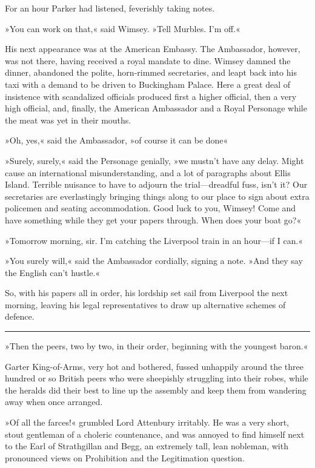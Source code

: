 For an hour Parker had listened, feverishly taking notes.

»You can work on that,« said Wimsey. »Tell Murbles. I'm off.«

His next appearance was at the American Embassy. The Ambassador, however, was not there, having received a royal mandate to dine. Wimsey damned the dinner, abandoned the polite, horn-rimmed secretaries, and leapt back into his taxi with a demand to be driven to Buckingham Palace. Here a great deal of insistence with scandalized officials produced first a higher official, then a very high official, and, finally, the American Ambassador and a Royal Personage while the meat was yet in their mouths.

»Oh, yes,« said the Ambassador, »of course it can be done\longdash«

»Surely, surely,« said the Personage genially, »we mustn't have any delay. Might cause an international misunderstanding, and a lot of paragraphs about Ellis Island. Terrible nuisance to have to adjourn the trial—dreadful fuss, isn't it? Our secretaries are everlastingly bringing things along to our place to sign about extra policemen and seating accommodation. Good luck to you, Wimsey! Come and have something while they get your papers through. When does your boat go?«

»Tomorrow morning, sir. I'm catching the Liverpool train in an hour—if I can.«

»You surely will,« said the Ambassador cordially, signing a note. »And they say the English can't hustle.«

So, with his papers all in order, his lordship set sail from Liverpool the next morning, leaving his legal representatives to draw up alternative schemes of defence. 

\noindent\hfil\rule{0.5\textwidth}{.4pt}\hfil 

»Then the peers, two by two, in their order, beginning with the youngest baron.«

Garter King-of-Arms, very hot and bothered, fussed unhappily around the three hundred or so British peers who were sheepishly struggling into their robes, while the heralds did their best to line up the assembly and keep them from wandering away when once arranged.

»Of all the farces!« grumbled Lord Attenbury irritably. He was a very short, stout gentleman of a choleric countenance, and was annoyed to find himself next to the Earl of Strathgillan and Begg, an extremely tall, lean nobleman, with pronounced views on Prohibition and the Legitimation question.

